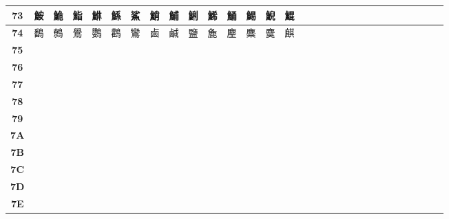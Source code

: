\begin{table}[H]
\begin{tabular}{|Sc|Sc|Sc|Sc|Sc|Sc|Sc|Sc|Sc|Sc|Sc|Sc|Sc|Sc|Sc|}
\textbf{73} & 鮟 & 鮠 & 鮨 & 鮴 & 鯀 & 鯊 & 鮹 & 鯆 & 鯏 & 鯑 & 鯒 & 鯣 & 鯢 & 鯤 \\ \hline
\textbf{74} & 鷭 & 鷯 & 鷽 & 鸚 & 鸛 & 鸞 & 鹵 & 鹹 & 鹽 & 麁 & 麈 & 麋 & 麌 & 麒 \\ \hline
\textbf{75} &  &  &  &  &  &  &  &  &  &  &  &  &  &  \\ \hline
\textbf{76} &  &  &  &  &  &  &  &  &  &  &  &  &  &  \\ \hline
\textbf{77} &  &  &  &  &  &  &  &  &  &  &  &  &  &  \\ \hline
\textbf{78} &  &  &  &  &  &  &  &  &  &  &  &  &  &  \\ \hline
\textbf{79} &  &  &  &  &  &  &  &  &  &  &  &  &  &  \\ \hline
\textbf{7A} &  &  &  &  &  &  &  &  &  &  &  &  &  &  \\ \hline
\textbf{7B} &  &  &  &  &  &  &  &  &  &  &  &  &  &  \\ \hline
\textbf{7C} &  &  &  &  &  &  &  &  &  &  &  &  &  &  \\ \hline
\textbf{7D} &  &  &  &  &  &  &  &  &  &  &  &  &  &  \\ \hline
\textbf{7E} &  &  &  &  &  &  &  &  &  &  &  &  &  &  \\ \hline
\end{tabular}
\end{table}

